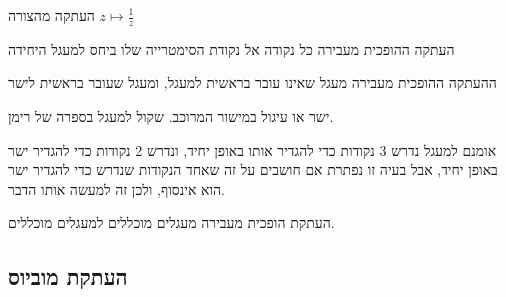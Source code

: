\documentclass{tstextbook}
\begin{document}
\begin{definition}
העתקה מהצורה \(z\mapsto \frac{1}{z}\)

\end{definition}
\begin{proposition}
העתקה ההופכית מעבירה כל נקודה אל נקודת הסימטרייה שלו ביחס למעגל היחידה

\end{proposition}
\begin{proposition}
ההעתקה ההופכית מעבירה מעגל שאינו עובר בראשית למעגל, ומעגל שעובר בראשית לישר

\end{proposition}
\begin{definition}
ישר או עיגול במישור המרוכב. שקול למעגל בספרה של רימן.

\end{definition}
\begin{remark}
אומנם למעגל נדרש 3 נקודות כדי להגדיר אותו באופן יחיד, ונדרש 2 נקודות כדי להגדיר ישר באופן יחיד, אבל בעיה זו נפתרת אם חושבים על זה שאחד הנקודות שנדרש כדי להגדיר ישר הוא אינסוף, ולכן זה למעשה אותו הדבר.

\end{remark}
\begin{corollary}
העתקת הופכית מעבירה מעגלים מוכללים למעגלים מוכללים.

\end{corollary}
\subsection{העתקת מוביוס}
\end{document}
